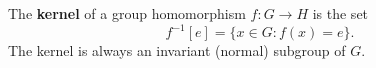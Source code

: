 The \textbf{kernel} of a group homomorphism $f \colon G \to H$ is the set
$$f^{-1}[e] = \{x \in G : f(x) = e\}.$$
The kernel is always an invariant (normal) subgroup of $G$.
